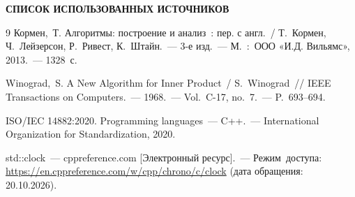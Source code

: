 \clearpage
{}
{}

\begin{center}
    \LARGE\bfseries СПИСОК ИСПОЛЬЗОВАННЫХ ИСТОЧНИКОВ
\end{center}
\vspace{10pt}

\begingroup
\renewcommand{\chapter}[2]{}
\begin{thebibliography}{9}
    Кормен,~Т. Алгоритмы: построение и анализ~: пер. с англ.~/ Т.~Кормен, Ч.~Лейзерсон, Р.~Ривест, К.~Штайн.~--- 3-е изд.~--- М.~:~ООО «И.Д. Вильямс», 2013.~--- 1328~с.

    Winograd,~S. A New Algorithm for Inner Product~/ S.~Winograd~// IEEE Transactions on Computers.~--- 1968.~--- Vol.~C-17, no.~7.~--- P.~693--694.

    ISO/IEC 14882:2020. Programming languages~--- C++.~--- International Organization for Standardization, 2020.

    std::clock~--- cppreference.com [Электронный ресурс].~--- Режим~доступа: \url{https://en.cppreference.com/w/cpp/chrono/c/clock} (дата обращения: 20.10.2026).
\end{thebibliography}
\endgroup